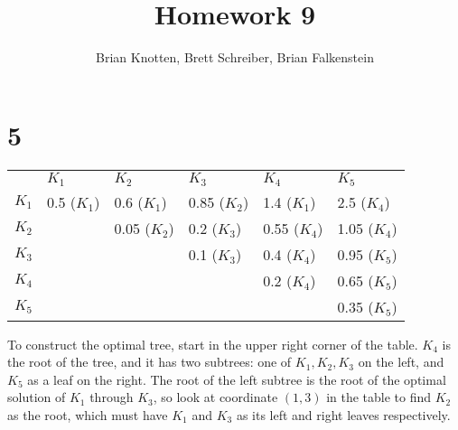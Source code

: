 \documentclass[letterpaper,notitlepage,twoside]{article}
\begin{document}
\title{Homework 9}
\author{Brian Knotten, Brett Schreiber, Brian Falkenstein}
\maketitle

\section*{5}
\begin{tabular}{llllll}
                           & $K_1$                            & $K_2$                             & $K_3$                             & $K_4$                             & $K_5$                             \\ \cline{2-6} 
\multicolumn{1}{l|}{$K_1$} & \multicolumn{1}{l|}{0.5 ($K_1$)} & \multicolumn{1}{l|}{0.6 ($K_1$)}  & \multicolumn{1}{l|}{0.85 ($K_2$)} & \multicolumn{1}{l|}{1.4 ($K_1$)}  & \multicolumn{1}{l|}{2.5 ($K_4$)}  \\ \cline{2-6} 
\multicolumn{1}{l|}{$K_2$} & \multicolumn{1}{l|}{}            & \multicolumn{1}{l|}{0.05 ($K_2$)} & \multicolumn{1}{l|}{0.2 ($K_3$)}  & \multicolumn{1}{l|}{0.55 ($K_4$)} & \multicolumn{1}{l|}{1.05 ($K_4$)} \\ \cline{2-6} 
\multicolumn{1}{l|}{$K_3$} & \multicolumn{1}{l|}{}            & \multicolumn{1}{l|}{}             & \multicolumn{1}{l|}{0.1 ($K_3$)}  & \multicolumn{1}{l|}{0.4 ($K_4$)}  & \multicolumn{1}{l|}{0.95 ($K_5$)} \\ \cline{2-6} 
\multicolumn{1}{l|}{$K_4$} & \multicolumn{1}{l|}{}            & \multicolumn{1}{l|}{}             & \multicolumn{1}{l|}{}             & \multicolumn{1}{l|}{0.2 ($K_4$)}  & \multicolumn{1}{l|}{0.65 ($K_5$)} \\ \cline{2-6} 
\multicolumn{1}{l|}{$K_5$} & \multicolumn{1}{l|}{}            & \multicolumn{1}{l|}{}             & \multicolumn{1}{l|}{}             & \multicolumn{1}{l|}{}             & \multicolumn{1}{l|}{0.35 ($K_5$)} \\ \cline{2-6} 
\end{tabular}

To construct the optimal tree, start in the upper right corner of the table. $K_4$ is the root of the tree, and it has two subtrees: one of $K_1, K_2, K_3$ on the left, and $K_5$ as a leaf on the right. The root of the left subtree is the root of the optimal solution of $K_1$ through $K_3$, so look at coordinate $(1, 3)$ in the table to find $K_2$ as the root, which must have $K_1$ and $K_3$ as its left and right leaves respectively.
\end{document}
